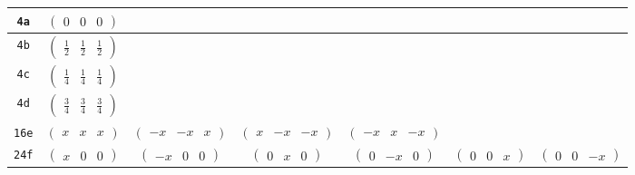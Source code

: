 \documentclass[fleqn,9pt,landscape]{jsarticle}
\begin{document}
\begin{center}
\begin{longtable}{ccccccc}
{\tt 4a} & $ \begin{pmatrix} 0 & 0 & 0 \end{pmatrix} $ & $  $ & $  $ & $  $ & $  $ & $  $ \\ \hline
{\tt 4b} & $ \begin{pmatrix} \frac{1}{2} & \frac{1}{2} & \frac{1}{2} \end{pmatrix} $ & $  $ & $  $ & $  $ & $  $ & $  $ \\ \hline
{\tt 4c} & $ \begin{pmatrix} \frac{1}{4} & \frac{1}{4} & \frac{1}{4} \end{pmatrix} $ & $  $ & $  $ & $  $ & $  $ & $  $ \\ \hline
{\tt 4d} & $ \begin{pmatrix} \frac{3}{4} & \frac{3}{4} & \frac{3}{4} \end{pmatrix} $ & $  $ & $  $ & $  $ & $  $ & $  $ \\ \hline
{\tt 16e} & $ \begin{pmatrix} x & x & x \end{pmatrix} $ & $ \begin{pmatrix} - x & - x & x \end{pmatrix} $ & $ \begin{pmatrix} x & - x & - x \end{pmatrix} $ & $ \begin{pmatrix} - x & x & - x \end{pmatrix} $ & $  $ & $  $ \\ \hline
{\tt 24f} & $ \begin{pmatrix} x & 0 & 0 \end{pmatrix} $ & $ \begin{pmatrix} - x & 0 & 0 \end{pmatrix} $ & $ \begin{pmatrix} 0 & x & 0 \end{pmatrix} $ & $ \begin{pmatrix} 0 & - x & 0 \end{pmatrix} $ & $ \begin{pmatrix} 0 & 0 & x \end{pmatrix} $ & $ \begin{pmatrix} 0 & 0 & - x \end{pmatrix} $ \\ \hline

\end{longtable}
\end{center}
\end{document}
